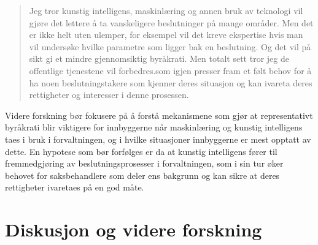 \documentclass[
]{book}
\begin{document}
\begin{quote}
Jeg tror kunstig intelligens, maskinlæring og annen bruk av teknologi vil gjøre det lettere å ta vanskeligere beslutninger på mange områder.
Men det er ikke helt uten ulemper, for eksempel vil det kreve ekspertise hvis man vil undersøke hvilke parametre som ligger bak en beslutning.
Og det vil på sikt gi et mindre gjennomsiktig byråkrati.
Men totalt sett tror jeg de offentlige tjenestene vil forbedres.som igjen presser fram et følt behov for å ha noen beslutningstakere som kjenner deres situasjon og kan ivareta deres rettigheter og interesser i denne prosessen.
\end{quote}

Videre forskning bør fokusere på å forstå mekanismene som gjør at representativt byråkrati blir viktigere for innbyggerne når maskinlæring og kunstig intelligens taes i bruk i forvaltningen, og i hvilke situasjoner innbyggerne er mest opptatt av dette.
En hypotese som bør forfølges er da at kunstig intelligens fører til fremmedgjøring av beslutningsprosesser i forvaltningen, som i sin tur øker behovet for saksbehandlere som deler ens bakgrunn og kan sikre at deres rettigheter ivaretaes på en god måte.

\hypertarget{diskusjon-og-videre-forskning}{%
\chapter{Diskusjon og videre forskning}\label{diskusjon-og-videre-forskning}}
\end{document}
